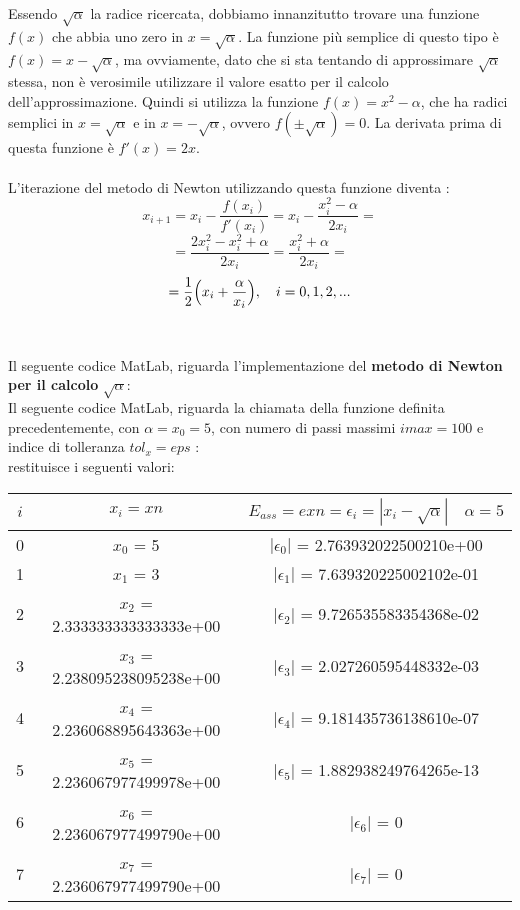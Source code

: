 Essendo $\sqrt{\alpha}$ la radice ricercata, dobbiamo innanzitutto trovare una funzione $f(x)$ che abbia uno zero in $x=\sqrt{\alpha}$. La funzione più semplice di questo tipo è $f(x)=x-\sqrt{\alpha}$, ma ovviamente, dato che si sta tentando di approssimare $\sqrt{\alpha}$ stessa, non è verosimile utilizzare il valore esatto per il calcolo dell'approssimazione. Quindi si
utilizza la funzione $f(x) = x^2-\alpha$, che ha radici semplici in $x=\sqrt{\alpha}$ e in $x=-\sqrt{\alpha}$, ovvero $f(\pm\sqrt{\alpha})=0$. La derivata prima di questa funzione è $f'(x)=2x$.\\\\
L'iterazione del metodo di Newton utilizzando questa funzione diventa :
	\[
	x_{i+1} = x_i-\frac{f(x_i)}{f'(x_i)} = x_i - \frac{x_i^2-\alpha}{2x_i} =
	\]
	\[
	= \frac{2x_i^2-x_i^2+\alpha}{2x_i} = \frac{x_i^2+\alpha}{2x_i} =
	\]
	\[
	= \frac{1}{2} \Bigl( x_i+\frac{\alpha}{x_i} \Bigl),\quad i=0,1,2,...
	\]\\\\
Il seguente codice MatLab, riguarda l'implementazione del \textbf{metodo di Newton per il calcolo} $\sqrt{\alpha}$:\\ 
	
Il seguente codice MatLab, riguarda la chiamata della funzione definita precedentemente, con $\alpha=x_0=5$, con numero di passi massimi $imax=100$ e indice di tolleranza $tol_x=eps$ :\\
	
restituisce i seguenti valori:\\
\begin{center}
	\begin{tabular}{|c|c|c|}
		\hline
			$i$ & $x_i=xn$ & $E_{ass}=exn=\epsilon_i=|x_i-\sqrt{\alpha}| \quad \alpha=5$ \\
		\hline
    		0 & $x_0$ = 5 & $|\epsilon_0|$ = 2.763932022500210e+00\\
    		1 & $x_1$ = 3 & $|\epsilon_1|$ = 7.639320225002102e-01\\
    		2 & $x_2$ = 2.333333333333333e+00 & $|\epsilon_2|$ = 9.726535583354368e-02\\
    		3 & $x_3$ = 2.238095238095238e+00 & $|\epsilon_3|$ = 2.027260595448332e-03\\
    		4 & $x_4$ = 2.236068895643363e+00 & $|\epsilon_4|$ = 9.181435736138610e-07\\
    		5 & $x_5$ = 2.236067977499978e+00 & $|\epsilon_5|$ = 1.882938249764265e-13\\
    		6 & $x_6$ = 2.236067977499790e+00 & $|\epsilon_6|$ = 0\\
    		7 & $x_7$ = 2.236067977499790e+00 & $|\epsilon_7|$ = 0\\
		\hline
	\end{tabular}
\end{center}